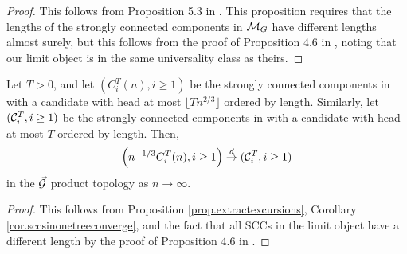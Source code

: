 \begin{proof}
This follows from Proposition 5.3 in \cite{Goldschmidt2019}. This proposition requires that the lengths of the strongly connected components in ${\mathcal M}_{G}$ have different lengths almost surely, but this follows from the proof of Proposition 4.6 in \cite{Goldschmidt2019}, noting that our limit object is in the same universality class as theirs.
\end{proof}

\begin{corollary}\label{cor.sccordereduptotimeT}
Let $T>0$, and let $(C^T_i(n),i\geq 1)$ be the strongly connected components in  with a candidate with head at most $\lfloor T n^{2/3}\rfloor$ ordered by length. Similarly, let $({\mathcal C}^T_i,i\geq 1)$ be the strongly connected components in  with a candidate with head at most $T$ ordered by length. Then,
$$\left(n^{-1/3}C^T_i(n), i\geq 1\right) \overset{d}{\to} ({\mathcal C}^T_i,i\geq 1)$$
in the $\vec{{\mathcal G}}$ product topology as $n\to \infty$. 
\end{corollary}
\begin{proof}
This follows from Proposition \ref{prop.extractexcursions}, Corollary \ref{cor.sccsinonetreeconverge}, and the fact that all SCCs in the limit object have a different length by the proof of Proposition 4.6 in \cite{Goldschmidt2019}. 
\end{proof}


